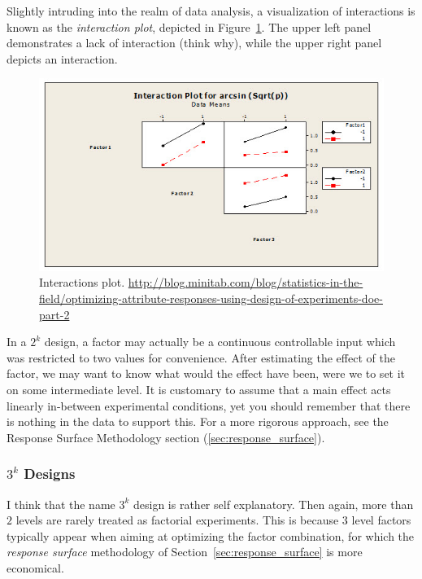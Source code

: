 Slightly intruding into the realm of data analysis, a visualization of interactions is known as the \emph{interaction plot}, depicted in Figure~\ref{fig:interaction_plot}. 
The upper left panel demonstrates a lack of interaction (think why), while the upper right panel depicts an interaction.
\begin{figure}[ht]
\centering
\includegraphics[width=0.3\textheight]{art/attribute_doe_interaction_plot}
\caption{Interactions plot. \newline \url{http://blog.minitab.com/blog/statistics-in-the-field/optimizing-attribute-responses-using-design-of-experiments-doe-part-2}}
\label{fig:interaction_plot}
\end{figure}



\begin{remark}
In a $2^k$ design, a factor may actually be a continuous controllable input which was restricted to two values for convenience. 
After estimating the effect of the factor, we may want to know what would the effect have been, were we to set it on some intermediate level.
It is customary to assume that a main effect acts linearly in-between experimental conditions, yet you should remember that there is nothing in the data to support this.
For a more rigorous approach, see the Response Surface Methodology section (\ref{sec:response_surface}).
\end{remark}



\subsubsection{$3^k$ Designs}
I think that the name $3^k$ design is rather self explanatory.
Then again, more than $2$ levels are rarely treated as factorial experiments. 
This is because $3$ level factors typically appear when aiming at optimizing the factor combination, for which the \emph{response surface} methodology of Section~\ref{sec:response_surface} is more economical.




